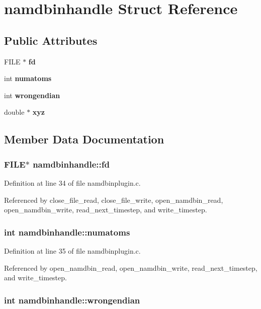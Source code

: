 \section{namdbinhandle  Struct Reference}
\label{structnamdbinhandle}
\subsection*{Public Attributes}
\begin{CompactItemize}
\item 
FILE $\ast$ {\bf fd}
\item 
int {\bf numatoms}
\item 
int {\bf wrongendian}
\item 
double $\ast$ {\bf xyz}
\end{CompactItemize}


\subsection{Member Data Documentation}
\subsubsection{\setlength{\rightskip}{0pt plus 5cm}FILE$\ast$ namdbinhandle::fd}\label{structnamdbinhandle_m0}




Definition at line 34 of file namdbinplugin.c.

Referenced by close\_\-file\_\-read, close\_\-file\_\-write, open\_\-namdbin\_\-read, open\_\-namdbin\_\-write, read\_\-next\_\-timestep, and write\_\-timestep.
\subsubsection{\setlength{\rightskip}{0pt plus 5cm}int namdbinhandle::numatoms}\label{structnamdbinhandle_m1}




Definition at line 35 of file namdbinplugin.c.

Referenced by open\_\-namdbin\_\-read, open\_\-namdbin\_\-write, read\_\-next\_\-timestep, and write\_\-timestep.
\subsubsection{\setlength{\rightskip}{0pt plus 5cm}int namdbinhandle::wrongendian}\label{structnamdbinhandle_m2}




